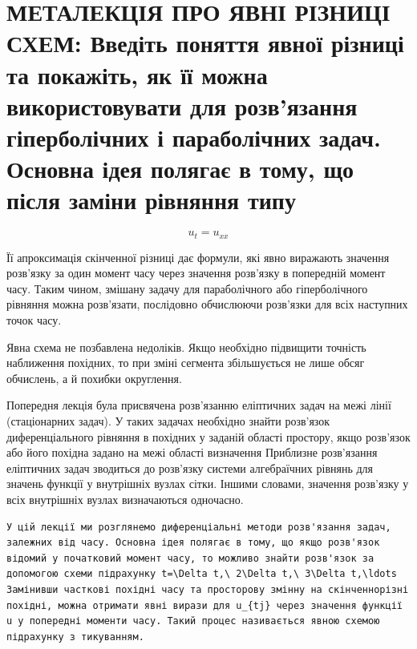 \documentclass[
  ukrainian,
]{article}
\begin{document}
\section{МЕТАЛЕКЦІЯ ПРО ЯВНІ РІЗНИЦІ СХЕМ: Введіть поняття явної різниці
та покажіть, як її можна використовувати для розв'язання гіперболічних і
параболічних задач. Основна ідея полягає в тому, що після заміни
рівняння
типу}\label{ux43cux435ux442ux430ux43bux435ux43aux446ux456ux44f-ux43fux440ux43e-ux44fux432ux43dux456-ux440ux456ux437ux43dux438ux446ux456-ux441ux445ux435ux43c-ux432ux432ux435ux434ux456ux442ux44c-ux43fux43eux43dux44fux442ux442ux44f-ux44fux432ux43dux43eux457-ux440ux456ux437ux43dux438ux446ux456-ux442ux430-ux43fux43eux43aux430ux436ux456ux442ux44c-ux44fux43a-ux457ux457-ux43cux43eux436ux43dux430-ux432ux438ux43aux43eux440ux438ux441ux442ux43eux432ux443ux432ux430ux442ux438-ux434ux43bux44f-ux440ux43eux437ux432ux44fux437ux430ux43dux43dux44f-ux433ux456ux43fux435ux440ux431ux43eux43bux456ux447ux43dux438ux445-ux456-ux43fux430ux440ux430ux431ux43eux43bux456ux447ux43dux438ux445-ux437ux430ux434ux430ux447.-ux43eux441ux43dux43eux432ux43dux430-ux456ux434ux435ux44f-ux43fux43eux43bux44fux433ux430ux454-ux432-ux442ux43eux43cux443-ux449ux43e-ux43fux456ux441ux43bux44f-ux437ux430ux43cux456ux43dux438-ux440ux456ux432ux43dux44fux43dux43dux44f-ux442ux438ux43fux443}

\[
u_t = u_{xx}
\]

Її апроксимація скінченної різниці дає формули, які явно виражають
значення розв'язку за один момент часу через значення розв'язку в
попередній момент часу. Таким чином, змішану задачу для параболічного
або гіперболічного рівняння можна розв'язати, послідовно обчислюючи
розв'язки для всіх наступних точок часу.

Явна схема не позбавлена недоліків. Якщо необхідно підвищити точність
наближення похідних, то при зміні сегмента збільшується не лише обсяг
обчислень, а й похибки округлення.

Попередня лекція була присвячена розв'язанню еліптичних задач на межі
лінії (стаціонарних задач). У таких задачах необхідно знайти розв'язок
диференціального рівняння в похідних у заданій області простору, якщо
розв'язок або його похідна задано на межі області визначення Приблизне
розв'язання еліптичних задач зводиться до розв'язку системи алгебраїчних
рівнянь для значень функції у внутрішніх вузлах сітки. Іншими словами,
значення розв'язку у всіх внутрішніх вузлах визначаються одночасно.

\begin{verbatim}
У цій лекції ми розглянемо диференціальні методи розв'язання задач, залежних від часу. Основна ідея полягає в тому, що якщо розв'язок відомий у початковий момент часу, то можливо знайти розв'язок за допомогою схеми підрахунку t=\Delta t,\ 2\Delta t,\ 3\Delta t,\ldots Замінивши часткові похідні часу та просторову змінну на скінченнорізні похідні, можна отримати явні вирази для u_{tj} через значення функції u у попередні моменти часу. Такий процес називається явною схемою підрахунку з тикуванням.
\end{verbatim}
\end{document}
